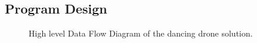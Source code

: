 \newpage
\onecolumn
\subsection{Program Design}


\begin{figure}[h]

\caption{High level Data Flow Diagram of the dancing drone solution.}
\end{figure}
